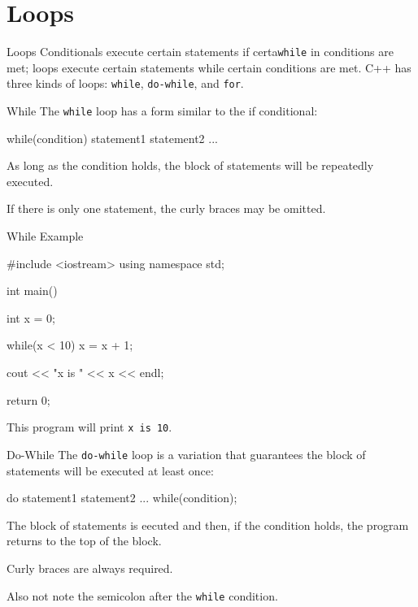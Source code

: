 \documentclass[../lecture3-flowofcontrol.tex]{subfiles}
\begin{document}
\section{Loops}


\begin{frame}[fragile]{Loops}
Conditionals execute certain statements if certa\texttt{while} in conditions are met; loops execute certain statements while certain conditions are met. C++ has three kinds of loops: \texttt{while}, \texttt{do-while}, and \texttt{for}.
\end{frame}


\begin{frame}[fragile]{While}
    The \texttt{while} loop has a form similar to the if conditional:

\begin{cppcode}[]
while(condition)
{
    statement1
    statement2
    ...
}
\end{cppcode}

    As long as the condition holds, the block of statements will be repeatedly executed. \newline

    If there is only one statement, the curly braces may be omitted.
\end{frame}

\begin{frame}[fragile]{While Example}
\begin{cppcode}[]
#include <iostream>
using namespace std;

int main()
{
    int x = 0;

    while(x < 10)
        x = x + 1;

    cout << "x is " << x << endl;

    return 0;
}
\end{cppcode}

    This program will print \verb|x is 10|.
\end{frame}

\begin{frame}[fragile]{Do-While}
    The \texttt{do-while} loop is a variation that guarantees the block of statements will be executed at least once:

\begin{cppcode}[]
do
{
    statement1
    statement2
    ...
}
while(condition);
\end{cppcode}

    The block of statements is eecuted and then, if the condition holds, the program returns to the top of the block. \newline

    Curly braces are always required. \newline

    Also not note the semicolon after the \texttt{while} condition.
\end{frame}
\end{document}

